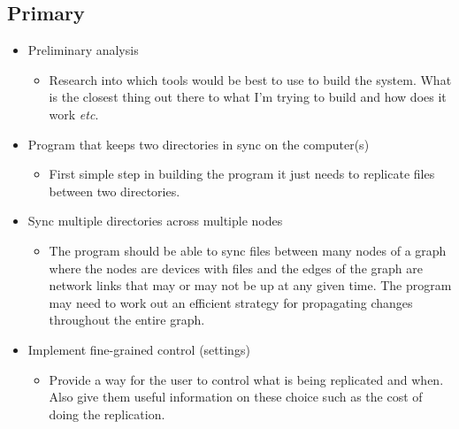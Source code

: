 \documentclass[12pt]{article}
\begin{document}
\subsection*{Primary} %
\begin{itemize}
    \item Preliminary analysis
        \begin{itemize}
        \item Research into which tools would be best to use to build the system. What is the closest thing out there to what I'm trying to build and how does it work \emph{etc}.
        \end{itemize}

    \item Program that keeps two directories in sync on the computer(s)
        \begin{itemize}
        \item First simple step in building the program it just needs to replicate files between two directories.
        \end{itemize}


    \item Sync multiple directories across multiple nodes
        \begin{itemize}
        \item The program should be able to sync files between many nodes of a graph where the nodes are devices with files and the edges of the graph are network links that may or may not be up at any given time. The program may need to work out an efficient strategy for propagating changes throughout the entire graph.
        \end{itemize}


    \item Implement fine-grained control (settings)
        \begin{itemize}
        \item Provide a way for the user to control what is being replicated and when. Also give them useful information on these choice such as the cost of doing the replication.
        \end{itemize}


\end{itemize}
\end{document}
